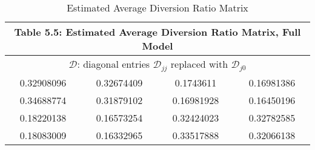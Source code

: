 
\begin{table}
\centering
\begin{tabular}{ |cccc| }
 \hline
\multicolumn{4}{|c|}{Table 5.5: Estimated Average Diversion Ratio Matrix, Full Model}
 \\
 \hline
\multicolumn{4}{|c|}{$\mathcal{D}$: diagonal entries $\mathcal{D}_{jj}$ replaced with $\mathcal{D}_{j0}$}
 \\
 \hline
 0.32908096 & 0.32674409 & 0.1743611 & 0.16981386   \\
0.34688774 & 0.31879102 & 0.16981928 & 0.16450196  \\
0.18220138 & 0.16573254 & 0.32424023 & 0.32782585  \\
0.18083009 & 0.16332965 & 0.33517888 & 0.32066138  \\
 \hline
\end{tabular}
\label{table5_5}
\caption{Estimated Average Diversion Ratio Matrix}
\end{table}
